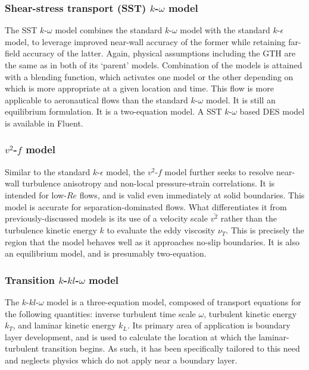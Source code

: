 \documentclass[11pt]{article}
\begin{document}
\subsubsection{Shear-stress transport (SST) $k$-$\omega$ model}

The SST $k$-$\omega$ model combines the standard $k$-$\omega$ model with the standard $k$-$\epsilon$ model, to leverage improved near-wall accuracy of the former while retaining far-field accuracy of the latter. Again, physical assumptions including the GTH are the same as in both of its `parent' models. Combination of the models is attained with a blending function, which activates one model or the other depending on which is more appropriate at a given location and time. This flow is more applicable to aeronautical flows than the standard $k$-$\omega$ model. It is still an equilibrium formulation. It is a two-equation model. A SST $k$-$\omega$ based DES model is available in Fluent.

\subsubsection{$v^2$-$f$ model}

Similar to the standard $k$-$\epsilon$ model, the $v^2$-$f$ model further seeks to resolve near-wall turbulence anisotropy and non-local pressure-strain correlations. It is intended for low-$Re$ flows, and is valid even immediately at solid boundaries. This model is accurate for separation-dominated flows. What differentiates it from previously-discussed models is its use of a velocity scale $\overline{v^2}$ rather than the turbulence kinetic energy $k$ to evaluate the eddy viscosity $\nu_T$. This is precisely the region that the model behaves well as it approaches no-slip boundaries. It is also an equilibrium model, and is presumably two-equation.

\subsubsection{Transition $k$-$kl$-$\omega$ model}

The $k$-$kl$-$\omega$ model is a three-equation model, composed of transport equations for the following quantities: inverse turbulent time scale $\omega$, turbulent kinetic energy $k_T$, and laminar kinetic energy $k_L$. Its primary area of application is boundary layer development, and is used to calculate the location at which the laminar-turbulent transition begins. As such, it has been specifically tailored to this need and neglects physics which do not apply near a boundary layer.
\end{document}
